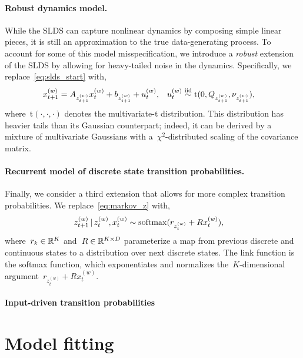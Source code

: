 \documentclass[11pt]{article}
\begin{document}
\paragraph{Robust dynamics model.}  While the SLDS can capture nonlinear
dynamics by composing simple linear pieces, it is still an approximation
to the true data-generating process.  To account for some of this
model misspecification, we introduce a \emph{robust} extension of the
SLDS by allowing for heavy-tailed noise in the dynamics.  Specifically,
we replace~\eqref{eq:slds_start} with,
\begin{align}
  x_{t+1}^{(w)} &= A_{z_{t+1}^{(w)}} x_{t}^{(w)} + b_{z_{t+1}^{(w)}} +  u_t^{(w)},
  &
  u_t^{(w)} &\stackrel{\text{iid}}{\sim} \mathrm{t}(0, Q_{z_{t+1}^{(w)}}, \nu_{z_{t+1}^{(w)}}),
\end{align}
where~$\mathrm{t}(\cdot, \cdot, \cdot)$ denotes the multivariate-t
distribution.  This distribution has heavier tails than its Gaussian
counterpart; indeed, it can be derived by a mixture of multivariate
Gaussians with a~$\chi^2$-distributed scaling of the covariance matrix. 

\paragraph{Recurrent model of discrete state transition probabilities.}
Finally, we consider a third extension that allows for more complex
transition probabilities.  We replace~\eqref{eq:markov_z} with,
\begin{align}
  z_{t+1}^{(w)} \,|\, z_t^{(w)}, x_t^{(w)}
  &\sim \mathrm{softmax}(r_{z_t^{(w)}} + R x_t^{(w)}),
    \label{eq:recurrent}
\end{align}
where~${r_k \in \mathbb{R}^K}$ and~${R \in \mathbb{R}^{K \times D}}$
parameterize a map from previous discrete and continuous states to a
distribution over next discrete states.  The link function is the
softmax function, which exponentiates and normalizes
the~$K$-dimensional argument~${r_{z_t^{(w)}} + R x_t^{(w)}}$.

\paragraph{Input-driven transition probabilities}


\section{Model fitting}
\end{document}
